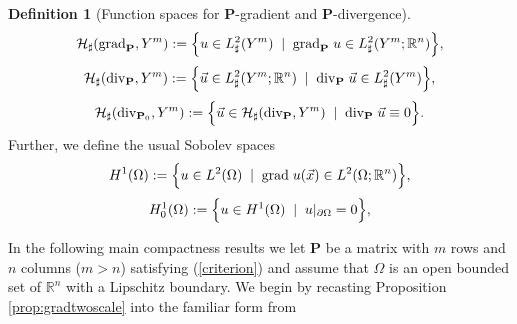 \documentclass[a4paper,reqno]{amsart}
\numberwithin{equation}{section}
\numberwithin{equation}{section}		%
\numberwithin{figure}{section}			%
\numberwithin{table}{section}				%
\newcommand{\R}{\mathbb{R}}
\newcommand{\ntodo}[1]{\todo[inline, backgroundcolor=blue!20!white, bordercolor=blue]{Niklas: #1}}
\theoremstyle{definition}
\newtheorem{definition}[theorem]{Definition}
\newcommand{\<}{\ensuremath \leq}
\renewcommand{\>}{\ensuremath \geq}
\def\O{\Omega}
\begin{document}
\begin{definition}[Function spaces for \textbf{P}-gradient and \textbf{P}-divergence]
\begin{equation}
\displaystyle
{\mathcal H}_{\sharp}(\mathrm{grad}_\textbf{P},Y^m) := \displaystyle{\Bigl \{u\in
{L^2_\sharp(Y^m)} \; \mid \; \mathrm{grad}_\textbf{P}\;u \in
{L^2_\sharp(Y^m; \R^n)}
\Bigr \},
}
\label{def:grad-Yspace}
\end{equation}
\begin{equation}
\displaystyle
{\mathcal H}_{\sharp}(\mathrm{div}_\textbf{P}, Y^m) :=  \displaystyle{\Bigl \{ \vec{u}\in
{L^2_\sharp(Y^m; \R^n)} \; \mid \; \mathrm{div}_\textbf{P}\;\vec{u}  \in
{L^2_\sharp(Y^m)}
\Bigr \},
}
\label{def:divR-Yspace}
\end{equation}
\begin{equation}
\displaystyle
{\mathcal H}_{\sharp}(\mathrm{div}_{\textbf{P}_0}, Y^m) :=  \displaystyle{\Bigl \{ \vec{u}\in
{\mathcal H}_{\sharp}(\mathrm{div}_\textbf{P}, Y^m) \; \mid \; \mathrm{div}_\textbf{P}\;\vec{u} \equiv 0 \Bigr \}.
}
\label{def:div_0-Yspace}
\end{equation}
Further, we define the usual Sobolev spaces 
\begin{equation}
\displaystyle
{H^{1}}(\Omega) :=  \displaystyle{\Bigl \{ u\in {L^2(\Omega)} \; \mid \; \mathrm{grad}\;u(\vec{x}) \in
{L^2(\Omega; \R^n)}
\Bigr \}},
\label{def:grad-space}
\end{equation}
\begin{equation}
\displaystyle
{H^{1}_0}(\Omega) :=  \displaystyle{ \Bigl\{ u\in H^1(\Omega)\; \mid \;  u|_{\partial \Omega} = 0
\Bigr \},
}
\label{def:grad_0-space}
\end{equation}
\end{definition}


In the following main compactness results we let $\textbf{P}$ be a matrix with $m$ rows and $n$ columns ($m>n$)
satisfying (\ref{criterion}) and assume that $\O$ is an open bounded set
of $\R^n$ with a Lipschitz boundary.
We begin by recasting  Proposition \ref{prop:gradtwoscale} into the familiar form from \cite{wellander2018two}
\end{document}
